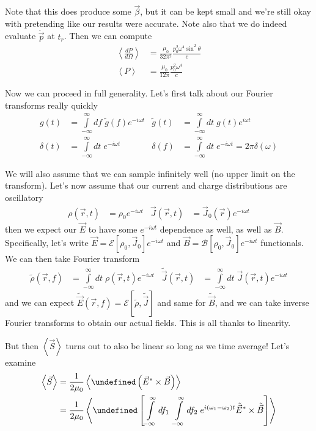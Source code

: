 \documentclass[10pt]{report}
\newcommand{\rd}[2]{\frac{d#1}{d#2}}
\let\Re\undefined
\DeclareMathOperator{\Re}{Re}
\newcommand{\expvalue}[1]{\left<#1\right>}
\begin{document}
Note that this does produce some $\vec{\beta}$, but it can be kept small and we're still okay with pretending like our results were accurate. Note also that we do indeed evaluate $\ddot{\vec{p}}$ at $t_r$. Then we can compute
\begin{align}
    \expvalue{\rd{P}{\Omega}} &= \frac{\mu_0}{32\pi^2}\frac{p_0^2\omega^4\sin^2\theta}{c}\\
    \expvalue{P} &= \frac{\mu_0}{12\pi}\frac{p_0^2\omega^4}{c}
\end{align}

Now we can proceed in full generality. Let's first talk about our Fourier transforms really quickly
\begin{align}
    g(t) &= \int\limits_{-\infty}^{\infty}df \;\tilde{g}(f) e^{-i\omega t} & \tilde{g}(t) &= \int\limits_{-\infty}^{\infty}dt\;g(t)e^{i\omega t}\\
    \delta(t) &= \int\limits_{-\infty}^{\infty}dt\;e^{-i\omega t} & \delta(f) &= \int\limits_{-\infty}^{\infty}dt \;e^{-i \omega t} = 2\pi \delta(\omega)
\end{align}

We will also assume that we can sample infinitely well (no upper limit on the transform). Let's now assume that our current and charge distributions are oscillatory
\begin{align}
    \rho(\vec{r},t) &= \rho_0 e^{-i \omega t} & \vec{J}(\vec{r},t) &= \vec{J}_0(\vec{r}) e^{-i \omega t}
\end{align}
then we expect our $\vec{E}$ to have some $e^{-i\omega t}$ dependence as well, as well as $\vec{B}$. Specifically, let's write $\vec{E} = \mathcal{E}\left[ \rho_0, \vec{J}_0 \right]e^{-i\omega t}$ and $\vec{B} = \mathcal{B}\left[ \rho_0, \vec{J}_0 \right]e^{-i\omega t}$ functionals. We can then take Fourier transform
\begin{align}
    \tilde{\rho}(\vec{r},f) &= \int\limits_{-\infty}^{\infty}dt\;\rho(\vec{r},t) e^{-i \omega t} & \tilde{\vec{J}}(\vec{r},t) &= \int\limits_{-\infty}^{\infty}dt\;\vec{J}(\vec{r},t) e^{-i \omega t}
\end{align}
and we can expect $\tilde{\vec{E}}(\vec{r},f) = \mathcal{E}\left[ \tilde{\rho}, \tilde{\vec{J}} \right]$ and same for $\tilde{\vec{B}}$, and we can take inverse Fourier transforms to obtain our actual fields. This is all thanks to linearity.

But then $\expvalue{\vec{S}}$ turns out to also be linear so long as we time average! Let's examine
\begin{align}
    \expvalue{\vec{S}} &= \frac{1}{2\mu_0}\expvalue{\Re\left( \vec{E}^* \times \vec{B} \right)}\\
    &= \frac{1}{2\mu_0} \expvalue{\Re\left[ \int\limits_{-\infty}^{\infty}df_1\;\int\limits_{-\infty}^{\infty}df_2\;e^{i\left( \omega_1 - \omega_2 \right)t}\tilde{\vec{E}}^* \times \tilde{\vec{B}} \right]}
\end{align}
\end{document}

